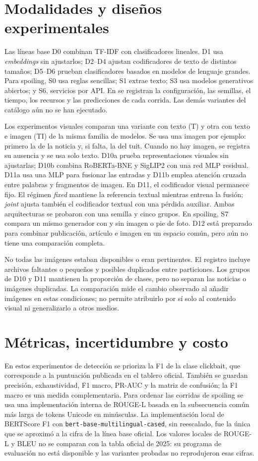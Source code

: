 \section{Modalidades y diseños experimentales}

Las líneas base D0 combinan TF-IDF con clasificadores lineales. D1 usa
\emph{embeddings} sin ajustarlos; D2--D4 ajustan codificadores de texto de
distintos tamaños; D5--D6 prueban clasificadores basados en modelos de
lenguaje grandes. Para spoiling, S0 usa reglas sencillas; S1 extrae texto;
S3 usa modelos generativos abiertos; y S6, servicios por API. En
 se registran la configuración,
las semillas, el tiempo, los recursos y las predicciones de cada corrida.
Las demás variantes del catálogo aún no se han ejecutado.

Los experimentos visuales comparan una variante con texto (T) y otra con
texto e imagen (TI) de la misma familia de modelos. Se usa una imagen por
ejemplo: primero la de la noticia y, si falta, la del tuit. Cuando no hay
imagen, se registra su ausencia y se usa solo texto. D10a prueba
representaciones visuales sin ajustarlas; D10b combina RoBERTa-BNE y SigLIP2
con una red MLP residual. D11a usa una MLP para fusionar las entradas y D11b
emplea atención cruzada entre palabras y fragmentos de imagen. En D11,
el codificador visual permanece fijo. El régimen \emph{fixed} mantiene la
referencia textual mientras entrena la fusión; \emph{joint} ajusta también
el codificador textual con una pérdida auxiliar. Ambas arquitecturas se
probaron con una semilla y cinco grupos. En spoiling, S7 compara un mismo
generador con y sin imagen o pie de foto. D12 está preparado para combinar
publicación, artículo e imagen en un espacio común, pero aún no tiene una
comparación completa.

No todas las imágenes estaban disponibles o eran pertinentes. El registro
incluye archivos faltantes o pequeños y posibles duplicados entre particiones.
Los grupos de D10 y D11 mantienen la proporción de clases, pero no separan
las noticias o imágenes duplicadas. La comparación mide el cambio observado
al añadir imágenes en estas condiciones; no permite atribuirlo por sí solo
al contenido visual ni generalizarlo a otros medios.

\section{Métricas, incertidumbre y costo}

En estos experimentos de detección se prioriza la F1 de la clase clickbait,
que corresponde a la puntuación publicada en el tablero oficial. También se
guardan precisión, exhaustividad, F1 macro, PR-AUC y la matriz de confusión;
la F1 macro es una medida complementaria. Para ordenar las corridas de spoiling se usa
una implementación interna de ROUGE-L basada en la subsecuencia común más
larga de tokens Unicode en minúsculas. La implementación local de BERTScore F1
con \texttt{bert-base-multilingual-cased}, sin reescalado, fue la única que
se aproximó a la cifra de la línea base oficial. Los valores locales de
ROUGE-L y BLEU no se comparan con la tabla oficial de 2025: su programa de
evaluación no está disponible y las variantes probadas no reprodujeron
esas cifras.

